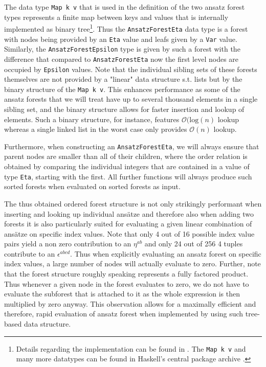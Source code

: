 The data type \texttt{Map k v} that is used in the definition of the two ansatz forest types represents a finite map between keys and values that is internally implemented as binary tree\footnote{Details regarding the implementation can be found in \cite{adams_1993}. The \texttt{Map k v} \cite{HackageMap} and many more datatypes can be found in Haskell's central package archive \cite{Hackage}.}. Thus the \texttt{AnsatzForestEta} data type is a forest with nodes being provided by an \texttt{Eta} value and leafs given by a \texttt{Var} value. Similarly, the \texttt{AnsatzForestEpsilon} type is given by such a forest with the difference that compared to \texttt{AnsatzForestEta} now the first level nodes are occupied by \texttt{Epsilon} values. Note that the individual sibling sets of these forests themselves are not provided by a "linear" data structure s.t. lists but by the binary structure of the \texttt{Map k v}. This enhances performance as some of the ansatz forests that we will treat have up to several thousand elements in a single sibling set, and the binary structure allows for faster insertion and lookup of elements. Such a binary structure, for instance, features $\mathcal{O}(\mathrm{log}(n)$ lookup whereas a single linked list in the worst case only provides $\mathcal{O}(n)$ lookup. 

Furthermore, when constructing an \texttt{AnsatzForestEta}, we will always ensure that parent nodes are smaller than all of their children, where the order relation is obtained by comparing the individual integers that are contained in a value of type \texttt{Eta}, starting with the first. All further functions will always produce such sorted forests when evaluated on sorted forests as input. 

The thus obtained ordered forest structure is not only strikingly performant when inserting and looking up individual ansätze and therefore also when adding two forests it is also particularly suited for evaluating a given linear combination of ansätze on specific index values. Note that only 4 out of 16 possible index value pairs yield a non zero contribution to an $\eta^{ab}$ and only 24 out of 256 4 tuples contribute to an $\epsilon^{abcd}$. Thus when explicitly evaluating an ansatz forest on specific index values, a large number of nodes will actually evaluate to zero. Further, note that the forest structure roughly speaking represents a fully factored product. Thus whenever a given node in the forest evaluates to zero, we do not have to evaluate the subforest that is attached to it as the whole expression is then multiplied by zero anyway. This observation allows for a maximally efficient and therefore, rapid evaluation of ansatz forest when implemented by using such tree-based data structure. 

